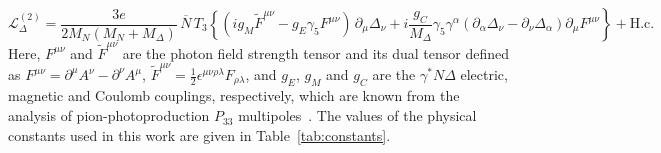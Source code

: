\documentclass[twocolumn,prc,showpacs,nofootinbib,preprintnumbers,amsmath,amssymb,superscriptaddress]{revtex4-1}
\def\eqlab#1{\label{eq:#1}}
\begin{document}
\begin{widetext}
\begin{equation}
\mathcal{L}^{(2)}_\Delta =  \frac{3e}{2M_N(M_N+M_\Delta)}\,\overline N\, T_3\left\{
\left(i g_M  \tilde F^{\mu\nu} - g_E \gamma_5 F^{\mu\nu}\right)\,\partial_{\mu}\Delta_\nu\right. +\left.i \frac{g_C}{M_\Delta}\gamma_5 \gamma^\alpha (\partial_\alpha \Delta_\nu-\partial_\nu \Delta_\alpha)\partial_\mu F^{\mu \nu} \right\}+\mbox{H.c.}
\eqlab{gammaNDeltaLag}
\end{equation}
Here, $F^{\mu\nu}$ and $\tilde F^{\mu\nu}$ are the photon field strength tensor and its dual tensor defined
as $F^{\mu\nu}=\partial^\mu A^\nu-\partial^\nu A^\mu$, $\tilde F^{\mu\nu}=\frac{1}{2}\epsilon^{\mu\nu\rho\lambda}F_{\rho\lambda}$,
and  $g_E$, $g_M$ and $g_C$ are the $\gamma^* N \Delta$ electric, magnetic and Coulomb couplings, respectively,
which are known from the analysis of pion-photoproduction $P_{33}$ multipoles~\cite{Pascalutsa:2005ts}. The values of the physical constants used in this work are given in Table~\ref{tab:constants}.
\end{widetext} 
\end{document}
